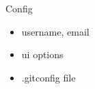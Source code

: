 \documentclass{beamer}
\begin{document}
\begin{frame}{Config}
  \begin{itemize}
    \item username, email
    \item ui options
    \item .gitconfig file
  \end{itemize}
\end{frame}
\end{document}
